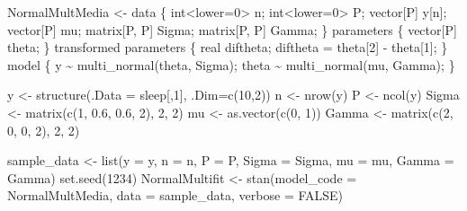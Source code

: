 \documentclass[
  10pt,
  spanish,
]{book}
\newenvironment{Shaded}{\begin{snugshade}}{\end{snugshade}}
\newcommand{\AttributeTok}[1]{\textcolor[rgb]{0.77,0.63,0.00}{#1}}
\newcommand{\ConstantTok}[1]{\textcolor[rgb]{0.00,0.00,0.00}{#1}}
\newcommand{\DecValTok}[1]{\textcolor[rgb]{0.00,0.00,0.81}{#1}}
\newcommand{\FloatTok}[1]{\textcolor[rgb]{0.00,0.00,0.81}{#1}}
\newcommand{\FunctionTok}[1]{\textcolor[rgb]{0.00,0.00,0.00}{#1}}
\newcommand{\NormalTok}[1]{#1}
\newcommand{\OtherTok}[1]{\textcolor[rgb]{0.56,0.35,0.01}{#1}}
\newcommand{\StringTok}[1]{\textcolor[rgb]{0.31,0.60,0.02}{#1}}
\theoremstyle{definition}
\theoremstyle{definition}
\theoremstyle{definition}
\theoremstyle{definition}
\theoremstyle{remark}
\begin{document}
\begin{Shaded}
\begin{Highlighting}[]
\NormalTok{NormalMultMedia }\OtherTok{\textless{}{-}} \StringTok{\textquotesingle{}}
\StringTok{data \{}
\StringTok{  int\textless{}lower=0\textgreater{} n;}
\StringTok{  int\textless{}lower=0\textgreater{} P;}
\StringTok{  vector[P] y[n];}
\StringTok{  vector[P] mu;}
\StringTok{  matrix[P, P] Sigma;}
\StringTok{  matrix[P, P] Gamma;}
\StringTok{\}}
\StringTok{parameters \{}
\StringTok{  vector[P] theta;}
\StringTok{\}}
\StringTok{transformed parameters \{}
\StringTok{  real diftheta;}
\StringTok{  diftheta = theta[2] {-} theta[1];}
\StringTok{\}}
\StringTok{model \{}
\StringTok{  y \textasciitilde{} multi\_normal(theta, Sigma);}
\StringTok{  theta \textasciitilde{} multi\_normal(mu, Gamma);}
\StringTok{\}}
\StringTok{\textquotesingle{}}

\NormalTok{y }\OtherTok{\textless{}{-}} \FunctionTok{structure}\NormalTok{(}\AttributeTok{.Data =}\NormalTok{ sleep[,}\DecValTok{1}\NormalTok{], }\AttributeTok{.Dim=}\FunctionTok{c}\NormalTok{(}\DecValTok{10}\NormalTok{,}\DecValTok{2}\NormalTok{))}
\NormalTok{n }\OtherTok{\textless{}{-}} \FunctionTok{nrow}\NormalTok{(y)}
\NormalTok{P }\OtherTok{\textless{}{-}} \FunctionTok{ncol}\NormalTok{(y)}
\NormalTok{Sigma  }\OtherTok{\textless{}{-}} \FunctionTok{matrix}\NormalTok{(}\FunctionTok{c}\NormalTok{(}\DecValTok{1}\NormalTok{, }\FloatTok{0.6}\NormalTok{, }\FloatTok{0.6}\NormalTok{, }\DecValTok{2}\NormalTok{), }\DecValTok{2}\NormalTok{, }\DecValTok{2}\NormalTok{)}
\NormalTok{mu }\OtherTok{\textless{}{-}} \FunctionTok{as.vector}\NormalTok{(}\FunctionTok{c}\NormalTok{(}\DecValTok{0}\NormalTok{, }\DecValTok{1}\NormalTok{))}
\NormalTok{Gamma }\OtherTok{\textless{}{-}} \FunctionTok{matrix}\NormalTok{(}\FunctionTok{c}\NormalTok{(}\DecValTok{2}\NormalTok{, }\DecValTok{0}\NormalTok{, }\DecValTok{0}\NormalTok{, }\DecValTok{2}\NormalTok{), }\DecValTok{2}\NormalTok{, }\DecValTok{2}\NormalTok{)}

\NormalTok{sample\_data }\OtherTok{\textless{}{-}} \FunctionTok{list}\NormalTok{(}\AttributeTok{y =}\NormalTok{ y, }\AttributeTok{n =}\NormalTok{ n, }\AttributeTok{P =}\NormalTok{ P,}
                    \AttributeTok{Sigma =}\NormalTok{ Sigma, }\AttributeTok{mu =}\NormalTok{ mu,}
                    \AttributeTok{Gamma =}\NormalTok{ Gamma)}
\FunctionTok{set.seed}\NormalTok{(}\DecValTok{1234}\NormalTok{)}
\NormalTok{NormalMultifit }\OtherTok{\textless{}{-}} \FunctionTok{stan}\NormalTok{(}\AttributeTok{model\_code =}\NormalTok{ NormalMultMedia,}
                   \AttributeTok{data =}\NormalTok{ sample\_data, }\AttributeTok{verbose =} \ConstantTok{FALSE}\NormalTok{)}
\end{Highlighting}
\end{Shaded}
\end{document}
